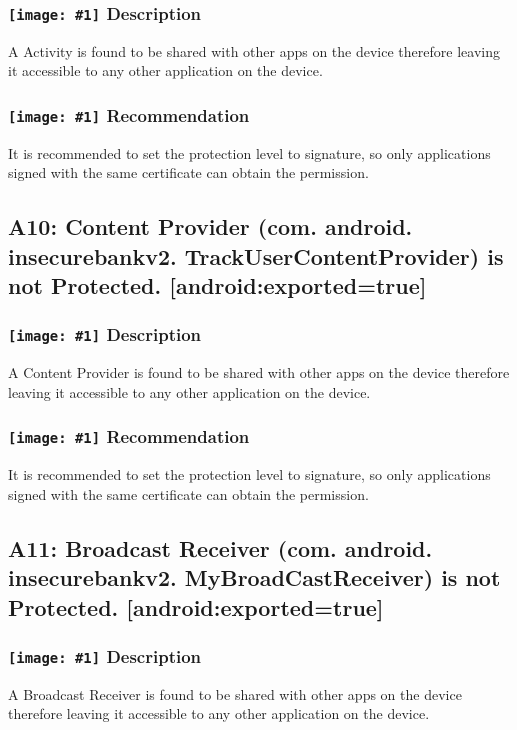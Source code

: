 \documentclass[12p]{article}
\newcommand{\icon}[1]{\texttt{[image: \#1]}}
\begin{document}
\subsubsection*{\protect\icon{/home/miki/Documents/GITHUB/AndroidPermissions/python/vulns/report_icons/basic_sheet.png} Description}
A Activity is found to be shared with other apps on the device therefore leaving it accessible to any other application on the device.
\subsubsection*{\protect\icon{/home/miki/Documents/GITHUB/AndroidPermissions/python/vulns/report_icons/basic_todo.png} Recommendation}
It is recommended to set the protection level to signature, so only applications signed with the same certificate can obtain the permission.
\subsection{A10: Content Provider (com. android. insecurebankv2. TrackUserContentProvider) is not Protected. [android:exported=true]}
\subsubsection*{\protect\icon{/home/miki/Documents/GITHUB/AndroidPermissions/python/vulns/report_icons/basic_sheet.png} Description}
A Content Provider is found to be shared with other apps on the device therefore leaving it accessible to any other application on the device.
\subsubsection*{\protect\icon{/home/miki/Documents/GITHUB/AndroidPermissions/python/vulns/report_icons/basic_todo.png} Recommendation}
It is recommended to set the protection level to signature, so only applications signed with the same certificate can obtain the permission.
\subsection{A11: Broadcast Receiver (com. android. insecurebankv2. MyBroadCastReceiver) is not Protected. [android:exported=true]}
\subsubsection*{\protect\icon{/home/miki/Documents/GITHUB/AndroidPermissions/python/vulns/report_icons/basic_sheet.png} Description}
A Broadcast Receiver is found to be shared with other apps on the device therefore leaving it accessible to any other application on the device.
\end{document}
